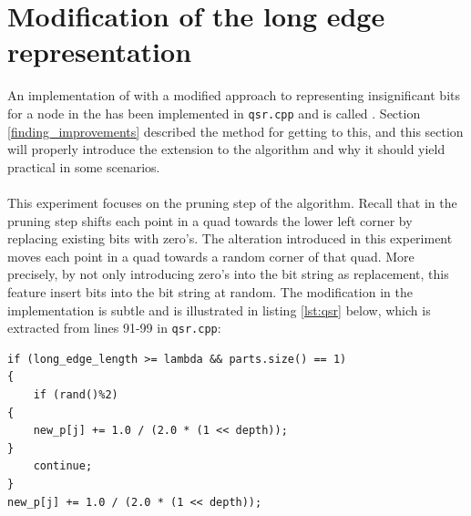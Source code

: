 \section{Modification of the \qs{} long edge representation}
\label{qsr}
An implementation of \qs{} with a modified approach to representing insignificant bits for a node in the \qt{} has been implemented in \texttt{qsr.cpp} and is called \qsr{}. Section \ref{finding_improvements} described the method for getting to this, and this section will properly introduce the extension to the algorithm and why it should yield practical in some scenarios.
\\
\\
This experiment focuses on the pruning step of the algorithm. Recall that in the pruning step \qs{} shifts each point in a quad towards the lower left corner by replacing existing bits with zero's. The alteration introduced in this experiment moves each point in a quad towards a random corner of that quad. More precisely, by not only introducing zero's into the bit string as replacement, this feature insert bits into the bit string at random. The modification in the implementation is subtle and is illustrated in listing \ref{lst:qsr} below, which is extracted from lines 91-99 in \texttt{qsr.cpp}:

\begin{lstlisting}[caption={Pruning with random bits},label={lst:qsr}]
if (long_edge_length >= lambda && parts.size() == 1)
{
	if (rand()%2)
{
	new_p[j] += 1.0 / (2.0 * (1 << depth));
}
	continue;
}
new_p[j] += 1.0 / (2.0 * (1 << depth));
\end{lstlisting}

